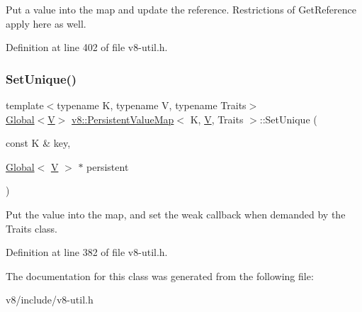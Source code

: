 Put a value into the map and update the reference. Restrictions of Get\+Reference apply here as well. 

Definition at line 402 of file v8-\/util.\+h.

\mbox{\label{classv8_1_1PersistentValueMap_a97ab74c7670e65dd5f95ec2940c4ab11}} 
\subsubsection{\texorpdfstring{Set\+Unique()}{SetUnique()}}
{\footnotesize\ttfamily template$<$typename K, typename V, typename Traits$>$ \\
\mbox{\hyperlink{classv8_1_1Global}{Global}}$<$\mbox{\hyperlink{classV}{V}}$>$ \mbox{\hyperlink{classv8_1_1PersistentValueMap}{v8\+::\+Persistent\+Value\+Map}}$<$ K, \mbox{\hyperlink{classV}{V}}, Traits $>$\+::Set\+Unique (\begin{DoxyParamCaption}\item[{const K \&}]{key,  }\item[{\mbox{\hyperlink{classv8_1_1Global}{Global}}$<$ \mbox{\hyperlink{classV}{V}} $>$ $\ast$}]{persistent }\end{DoxyParamCaption})\hspace{0.3cm}{\ttfamily [inline]}}

Put the value into the map, and set the \textquotesingle{}weak\textquotesingle{} callback when demanded by the Traits class. 

Definition at line 382 of file v8-\/util.\+h.



The documentation for this class was generated from the following file\+:\begin{DoxyCompactItemize}
\item 
v8/include/v8-\/util.\+h\end{DoxyCompactItemize}
